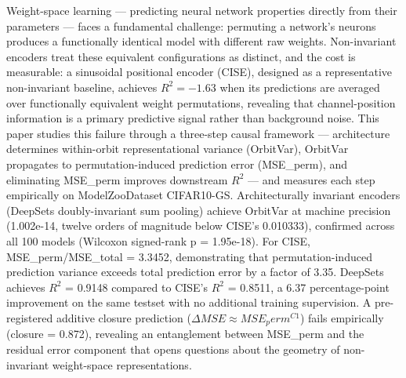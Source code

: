 
Weight-space learning --- predicting neural network properties directly from their parameters --- faces a fundamental challenge: permuting a network's neurons produces a functionally identical model with different raw weights. Non-invariant encoders treat these equivalent configurations as distinct, and the cost is measurable: a sinusoidal positional encoder (CISE), designed as a representative non-invariant baseline, achieves $R^2 = -1.63$ when its predictions are averaged over functionally equivalent weight permutations, revealing that channel-position information is a primary predictive signal rather than background noise. This paper studies this failure through a three-step causal framework --- architecture determines within-orbit representational variance (OrbitVar), OrbitVar propagates to permutation-induced prediction error (MSE\_perm), and eliminating MSE\_perm improves downstream $R^2$ --- and measures each step empirically on ModelZooDataset CIFAR10-GS. Architecturally invariant encoders (DeepSets doubly-invariant sum pooling) achieve OrbitVar at machine precision (1.002e-14, twelve orders of magnitude below CISE's 0.010333), confirmed across all 100 models (Wilcoxon signed-rank p = 1.95e-18). For CISE, MSE\_perm/MSE\_total = 3.3452, demonstrating that permutation-induced prediction variance exceeds total prediction error by a factor of 3.35. DeepSets achieves $R^2$ = 0.9148 compared to CISE's $R^2$ = 0.8511, a 6.37 percentage-point improvement on the same testset with no additional training supervision. A pre-registered additive closure prediction ($\Delta MSE \approx MSE_perm^{C1}$) fails empirically (closure = 0.872), revealing an entanglement between MSE\_perm and the residual error component that opens questions about the geometry of non-invariant weight-space representations.

